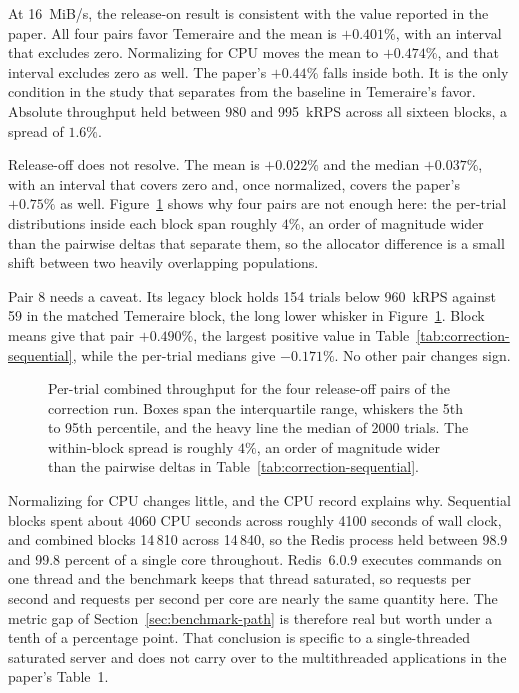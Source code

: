 \documentclass[sigconf]{acmart}
\begin{document}
At 16~MiB/s, the release-on result is consistent with the value reported in the
paper. All four pairs favor Temeraire and
the mean is $+0.401\%$, with an interval that excludes zero. Normalizing for CPU
moves the mean to $+0.474\%$, and that interval excludes zero as well. The
paper's $+0.44\%$ falls inside both. It is the only condition in the study that separates from the baseline in
Temeraire's favor. Absolute throughput held between 980 and 995~kRPS across
all sixteen blocks, a spread of $1.6\%$.

Release-off does not resolve. The mean is $+0.022\%$ and the median $+0.037\%$,
with an interval that covers zero and, once normalized, covers the paper's
$+0.75\%$ as well. Figure~\ref{fig:distributions} shows why four pairs are not
enough here: the per-trial distributions inside each block span roughly $4\%$,
an order of magnitude wider than the pairwise deltas that separate them, so the allocator difference is a small shift between two heavily overlapping populations.

Pair 8 needs a caveat. Its legacy block holds 154 trials below 960~kRPS
against 59 in the matched Temeraire block, the long lower whisker in Figure~\ref{fig:distributions}. Block means give that pair $+0.490\%$, the largest
positive value in Table~\ref{tab:correction-sequential}, while the per-trial
medians give $-0.171\%$. No other pair changes sign.

\begin{figure}[t]
\centering

\caption{Per-trial combined throughput for the four release-off pairs of the
correction run. Boxes span the interquartile range, whiskers the 5th to 95th
percentile, and the heavy line the median of 2000 trials. The within-block spread
is roughly $4\%$, an order of magnitude wider than the pairwise deltas in
Table~\ref{tab:correction-sequential}.}
\label{fig:distributions}
\end{figure}

Normalizing for CPU changes little, and the CPU record explains why. Sequential blocks spent about 4060 CPU seconds across roughly 4100 seconds of
wall clock, and combined blocks 14\,810 across 14\,840, so the Redis process
held between 98.9 and 99.8 percent of a single core throughout. Redis~6.0.9 executes commands on one thread and the benchmark keeps that
thread saturated, so requests per second and requests per second per core are
nearly the same quantity here. The metric gap of Section~\ref{sec:benchmark-path}
is therefore real but worth under a tenth of a percentage point. That
conclusion is specific to a single-threaded saturated server and does not
carry over to the multithreaded applications in the paper's Table~1.
\end{document}

